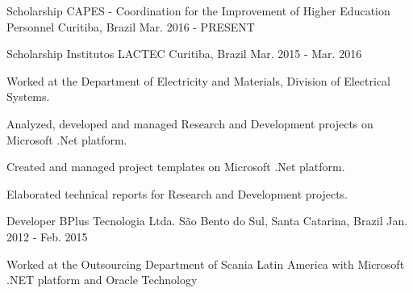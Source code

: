 

\begin{cventries}

  \cventry
    {Scholarship} %
    {CAPES - Coordination for the Improvement of Higher Education Personnel} %
    {Curitiba, Brazil} %
    {Mar. 2016 - PRESENT} %
    {
    }

  \cventry
    {Scholarship} %
    {Institutos LACTEC} %
    {Curitiba, Brazil} %
    {Mar. 2015 - Mar. 2016} %
    {
      \begin{cvitems} %
        \item {Worked at the Department of Electricity and Materials, Division of Electrical Systems.}
        \item {Analyzed, developed and managed Research and Development projects on Microsoft .Net platform.}
        \item {Created and managed project templates on Microsoft .Net platform.}
        \item {Elaborated technical reports for Research and Development projects.}
      \end{cvitems}
    }

  \cventry
    {Developer} %
    {BPlus Tecnologia Ltda.} %
    {São Bento do Sul, Santa Catarina, Brazil} %
    {Jan. 2012 - Feb. 2015} %
    {
      \begin{cvitems} %
        \item {Worked at the Outsourcing Department of Scania Latin America with Microsoft .NET platform and Oracle Technology}
      \end{cvitems}
    }


\end{cventries}
